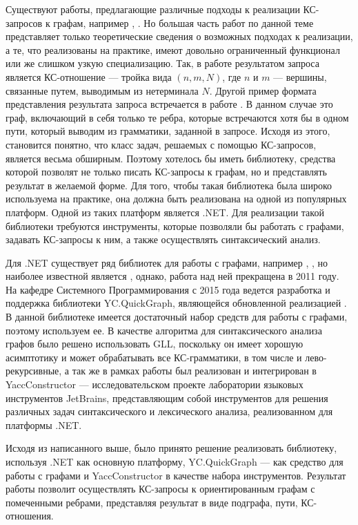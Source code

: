 \documentclass[14pt]{matmex-diploma-custom}
\begin{document}
	Существуют работы, предлагающие различные подходы к реализации КС-запросов к графам, например \cite{sevon2008subgraph}, \cite{hellings2014conjunctive}. Но большая часть работ по данной теме представляет только теоретические сведения о возможных подходах к реализации, а те, что реализованы на практике, имеют довольно ограниченный функционал или же слишком узкую специализацию. Так, в работе \cite{hellings2014conjunctive} результатом запроса является КС-отношение --- тройка вида \((n, m, N)\), где \(n\) и \(m\) --- вершины, связанные путем, выводимым из нетерминала \(N\). Другой пример формата представления результата запроса встречается в работе \cite{sevon2008subgraph}. В данном случае это граф, включающий в себя только те ребра, которые встречаются хотя бы в одном пути, который выводим из грамматики, заданной в запросе. Исходя из этого, становится понятно, что класс задач, решаемых с помощью КС-запросов, является весьма обширным. Поэтому хотелось бы иметь библиотеку, средства которой позволят не только писать КС-запросы к графам, но и представлять результат в желаемой форме. Для того, чтобы такая библиотека была широко используема на практике, она должна быть реализована на одной из популярных платформ. Одной из таких платформ является .NET. Для реализации такой библиотеки требуются инструменты, которые позволяли бы работать с графами, задавать КС-запросы к ним, а также осуществлять синтаксический анализ. 
	
	Для .NET существует ряд библиотек для работы с графами, например \cite{graphsharp}, \cite{agl}, но наиболее известной является \cite{quickgraph}, однако, работа над ней прекращена в 2011 году. На кафедре Системного Программирования с 2015 года ведется разработка и поддержка библиотеки YC.QuickGraph\cite{YC.QuickGraph}, являющейся обновленной реализацией \cite{quickgraph}. В данной библиотеке имеется достаточный набор средств для работы с графами, поэтому используем ее. В качестве алгоритма для синтаксического анализа графов было решено использовать GLL\cite{gll}, поскольку он имеет хорошую асимптотику и может обрабатывать все КС-грамматики, в том числе и лево-рекурсивные, а так же в рамках работы \cite{ragRelaxedParsing} был реализован и интегрирован в YaccConstructor \cite{YaccConstructorPage} --- исследовательском проекте лаборатории языковых инструментов JetBrains, представляющим собой инструментов для решения различных задач синтаксического и лексического анализа, реализованном для платформы .NET. 
	
	Исходя из написанного выше, было принято решение реализовать библиотеку, используя .NET как основную платформу, YC.QuickGraph --- как средство для работы с графами и YaccConstructor в качестве набора инструментов. Результат работы позволит осуществлять КС-запросы к ориентированным графам с помеченными ребрами, представляя результат в виде подграфа, пути, КС-отношения.
	
\end{document}
